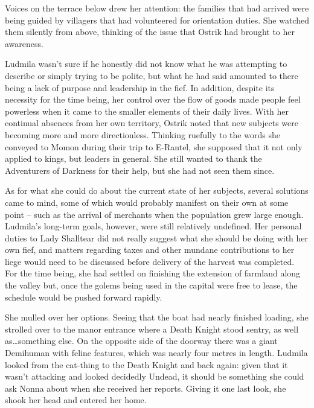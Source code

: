  

Voices on the terrace below drew her attention: the families that had arrived were being guided by villagers that had volunteered for orientation duties. She watched them silently from above, thinking of the issue that Ostrik had brought to her awareness.

 

Ludmila wasn’t sure if he honestly did not know what he was attempting to describe or simply trying to be polite, but what he had said amounted to there being a lack of purpose and leadership in the fief. In addition, despite its necessity for the time being, her control over the flow of goods made people feel powerless when it came to the smaller elements of their daily lives. With her continual absences from her own territory, Ostrik noted that new subjects were becoming more and more directionless. Thinking ruefully to the words she conveyed to Momon during their trip to E-Rantel, she supposed that it not only applied to kings, but leaders in general. She still wanted to thank the Adventurers of Darkness for their help, but she had not seen them since.

 

As for what she could do about the current state of her subjects, several solutions came to mind, some of which would probably manifest on their own at some point – such as the arrival of merchants when the population grew large enough. Ludmila’s long-term goals, however, were still relatively undefined. Her personal duties to Lady Shalltear did not really suggest what she should be doing with her own fief, and matters regarding taxes and other mundane contributions to her liege would need to be discussed before delivery of the harvest was completed. For the time being, she had settled on finishing the extension of farmland along the valley but, once the golems being used in the capital were free to lease, the schedule would be pushed forward rapidly.

 

She mulled over her options. Seeing that the boat had nearly finished loading, she strolled over to the manor entrance where a Death Knight stood sentry, as well as…something else. On the opposite side of the doorway there was a giant Demihuman with feline features, which was nearly four metres in length. Ludmila looked from the cat-thing to the Death Knight and back again: given that it wasn’t attacking and looked decidedly Undead, it should be something she could ask Nonna about when she received her reports. Giving it one last look, she shook her head and entered her home.


